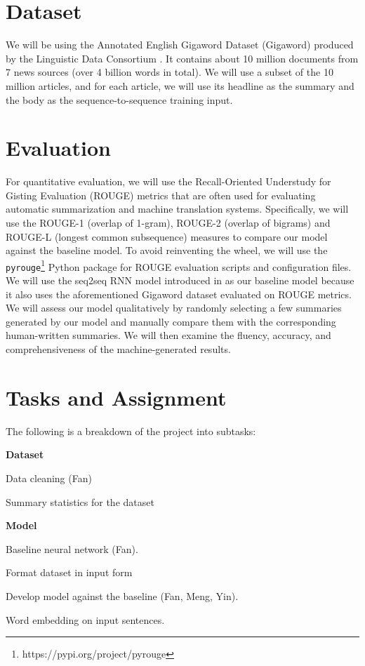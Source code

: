 \section{Dataset}
We will be using the Annotated English Gigaword Dataset (Gigaword) produced by the Linguistic Data Consortium \cite{napoles2012annotated}. It contains about 10 million documents from 7 news sources (over 4 billion words in total). We will use a subset of the 10 million articles, and for each article, we will use its headline as the summary and the body as the sequence-to-sequence training input.

\section{Evaluation}
For quantitative evaluation, we will use the Recall-Oriented Understudy for Gisting Evaluation (ROUGE) metrics that are often used for evaluating automatic summarization and machine translation systems. Specifically, we will use the ROUGE-1 (overlap of 1-gram), ROUGE-2 (overlap of bigrams) and ROUGE-L (longest common subsequence) measures to compare our model against the baseline model. To avoid reinventing the wheel, we will use the \texttt{pyrouge}\footnote{https://pypi.org/project/pyrouge} Python package for ROUGE evaluation scripts and configuration files. 
We will use the seq2seq RNN model introduced in \cite{nallapati2016abstractive} as our baseline model because it also uses the aforementioned Gigaword dataset evaluated on ROUGE metrics. We will assess our model qualitatively by randomly selecting a few summaries generated by our model and manually compare them with the corresponding human-written summaries. We will then examine the fluency, accuracy, and comprehensiveness of the machine-generated results.

\section{Tasks and Assignment}

The following is a breakdown of the project into subtasks:

\noindent
\textbf{Dataset}
\begin{compactitem}
\item Data cleaning (Fan)
\item Summary statistics for the dataset
\end{compactitem}

\noindent
\textbf{Model}
\begin{compactitem}
\item Baseline neural network (Fan).
\item Format dataset in input form 
\item Develop model against the baseline (Fan, Meng, Yin).
\item Word embedding on input sentences.
\end{compactitem}

